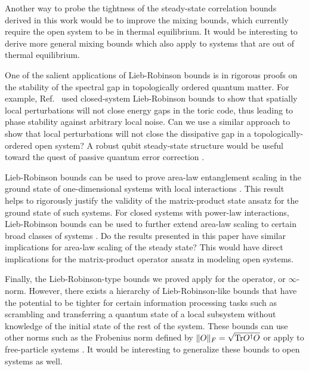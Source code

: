 Another way to probe the tightness of the steady-state correlation bounds derived in this work would be to improve the mixing bounds, which currently require the open system to be in thermal equilibrium.
It would be interesting to derive more general mixing bounds which also apply to systems that are out of thermal equilibrium.

One of the salient applications of Lieb-Robinson bounds is in rigorous proofs on the  stability of  the spectral gap in topologically ordered quantum matter. For example, Ref.~\cite{Bravyi2010} used closed-system Lieb-Robinson bounds to  show that spatially local perturbations will not close energy gaps in the toric code, thus leading to phase stability against arbitrary local noise. Can we use a similar approach to show that local perturbations will not close the dissipative gap in a topologically-ordered open system? A robust qubit steady-state structure would be useful toward the quest of passive quantum error correction \cite{Lidar1998}.

Lieb-Robinson bounds can be used  to prove area-law entanglement scaling in the ground state of one-dimensional systems with local interactions \cite{Hastings2007}. This result helps to rigorously justify the validity of the matrix-product state  ansatz for the ground state of such systems.  For closed systems with power-law interactions, Lieb-Robinson bounds can be used to further extend area-law scaling to certain broad classes of systems \cite{Gong2017}. Do the results presented in this paper have similar implications for area-law scaling of the steady state? This would have direct implications for the matrix-product operator ansatz in modeling open systems.

Finally, the Lieb-Robinson-type bounds we proved apply for the operator, or $\infty$-norm.
However, there exists a hierarchy of Lieb-Robinson-like bounds that have the potential to be tighter for certain information processing tasks such as scrambling and transferring a quantum state of a local subsystem without knowledge of the initial state of the rest of the system.
These bounds can use other norms such as the Frobenius norm defined by $\|O\|_F = \sqrt{\mathrm{Tr}{O^\dag O}}$ \cite{Tran2020hierarchylinearlightcones,Kuwahara2020aPolynomialGrowthOutoftimeorder,Yin2020ScramblingAlltoall,Chen2021Frobenius} or apply to free-particle systems \cite{Guo2019,Tran2020hierarchylinearlightcones}.
It would be interesting to generalize these bounds to open systems as well.
